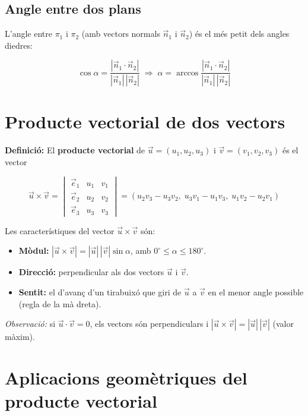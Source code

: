 \subsection{Angle entre dos plans}

L'angle entre $\pi_1$ i $\pi_2$ (amb vectors normals $\vec n_1$ i $\vec n_2$) és el més petit dels angles diedres:

\begin{equation*}
\cos\alpha = \frac{|\vec n_1\cdot\vec n_2|}{|\vec n_1|\,|\vec n_2|} \;\Rightarrow\; \alpha = \arccos\frac{|\vec n_1\cdot\vec n_2|}{|\vec n_1|\,|\vec n_2|}
\end{equation*}

\section{Producte vectorial de dos vectors}

\textbf{Definició:} El \textbf{producte vectorial} de $\vec u = (u_1, u_2, u_3)$ i $\vec v = (v_1, v_2, v_3)$ és el vector

\begin{equation}
\vec u\times\vec v = \begin{vmatrix} \vec e_1 & u_1 & v_1 \\ \vec e_2 & u_2 & v_2 \\ \vec e_3 & u_3 & v_3 \end{vmatrix} = (u_2v_3 - u_3v_2,\; u_3v_1 - u_1v_3,\; u_1v_2 - u_2v_1)
\end{equation}

Les característiques del vector $\vec u\times\vec v$ són:

\begin{itemize}
\item \textbf{Mòdul:} $|\vec u\times\vec v| = |\vec u|\,|\vec v|\sin\alpha$, amb $0^\circ \le \alpha \le 180^\circ$.
\item \textbf{Direcció:} perpendicular als dos vectors $\vec u$ i $\vec v$.
\item \textbf{Sentit:} el d'avanç d'un tirabuixó que giri de $\vec u$ a $\vec v$ en el menor angle possible (regla de la mà dreta).
\end{itemize}

\emph{Observació:} si $\vec u\cdot\vec v = 0$, els vectors són perpendiculars i $|\vec u\times\vec v| = |\vec u|\,|\vec v|$ (valor màxim).

\section{Aplicacions geomètriques del producte vectorial}

